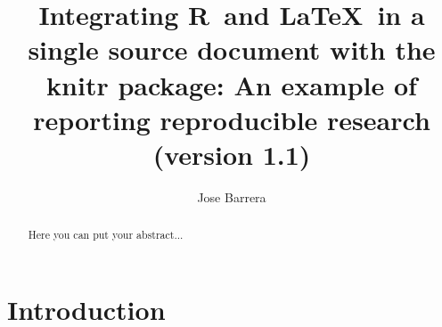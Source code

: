 \documentclass[10pt,a4paper,twoside]{article}
\newcommand{\R}{\textsf{R}}
\newcommand{\Rpackage}[1]{\textsf{#1}}
\begin{document}
\title{Integrating \R\ and \LaTeX\ in a single source document with the \Rpackage{knitr} package: An example of reporting reproducible research\vspace{1mm} \normalsize{\color{blue}(version 1.1)}}
\author[1,2]{Jose Barrera}

\maketitle

\thispagestyle{empty}

\clearpage
\begin{abstract}
Here you can put your abstract...
\end{abstract}

\clearpage
\tableofcontents
\clearpage




\section{Introduction}
\label{sec:intro}
\end{document}
